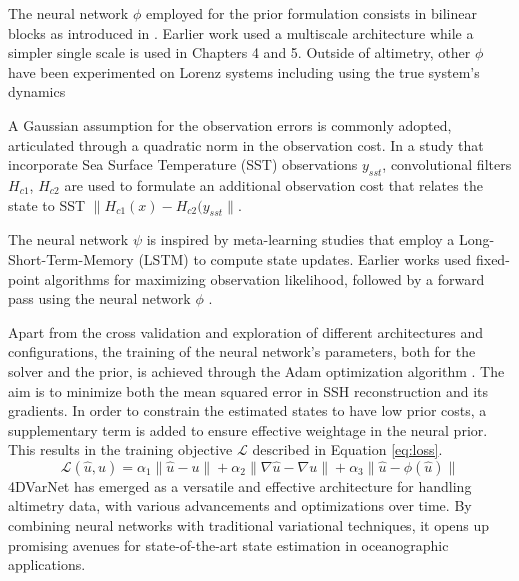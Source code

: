 \begin{bibunit}
The neural network $\phi$ employed for the prior formulation consists in bilinear blocks as introduced in \cite{fabletBilinearResidualNeural2018}. Earlier work \cite{fabletENDTOENDPHYSICSINFORMEDREPRESENTATION2021} used a multiscale architecture while a simpler single scale is used in Chapters 4 and 5. Outside of altimetry, other $\phi$ have been experimented on Lorenz systems including using the true system's dynamics\cite{fabletLearningVariationalData2021}

A Gaussian assumption for the observation errors is commonly adopted, articulated through a quadratic norm in the observation cost. In a study that incorporate Sea Surface Temperature (SST) observations $y_{sst} $\cite{fabletMultimodal4DVarNetsReconstruction2023}, convolutional filters $H_{c1}$, $H_{c2}$ are used to formulate an additional observation cost that relates the state to SST $\| H_{c1}(x) - H_{c2}(y_{sst}\|$.


The neural network $\psi$ is inspired by meta-learning studies \cite{andrychowiczLearningLearnGradient} that employ a Long-Short-Term-Memory (LSTM) to compute state updates\cite{fabletENDTOENDPHYSICSINFORMEDREPRESENTATION2021}. Earlier works used fixed-point algorithms for maximizing observation likelihood, followed by a forward pass using the neural network $\phi$ \cite{beauchampDatadrivenLearningbasedInterpolations2021}. 

Apart from the cross validation and exploration of different architectures and configurations, the training of the neural network's parameters, both for the solver and the prior, is achieved through the Adam optimization algorithm \cite{kingmaAdamMethodStochastic2017}. The aim is to minimize both the mean squared error in SSH reconstruction and its gradients. In order to constrain the estimated states to have low prior costs, a supplementary term is added to ensure effective weightage in the neural prior. This results in the training objective $\mathcal{L}$ described in Equation \ref{eq:loss}.
\begin{equation}
    \mathcal{L}(\hat{u}, u) = \alpha_1\| \hat{u} - u \| 
  + \alpha_2\| \nabla \hat{u} - \nabla u \| 
 + \alpha_3\| \hat{u} - \phi (\hat{u}) \|
 \label{eq:loss}
\end{equation}
4DVarNet has emerged as a versatile and effective architecture for handling altimetry data, with various advancements and optimizations over time. By combining neural networks with traditional variational techniques, it opens up promising avenues for state-of-the-art state estimation in oceanographic applications.

\end{bibunit}

